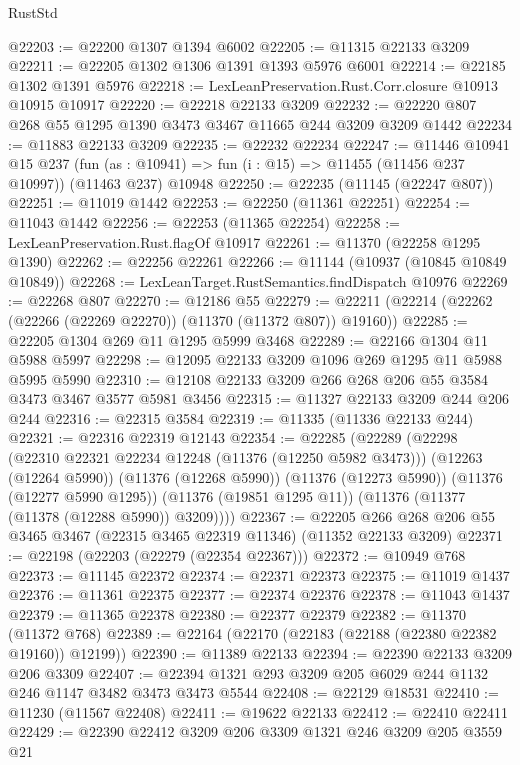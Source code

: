 \begin{lexlean}{RustStd}
\begin{coremodule}
{\begin{coremodule}
{{{{{{{{{{{{{{{{{{{{{{{{{{{{{{{{{{{{{{{{{{{{{{{{{{{{{{{{{{{{{{{{{{{{{{{{{{{{{{{{{{{{{@22203 := @22200 @1307 @1394 @6002
@22205 := @11315 @22133 @3209
@22211 := @22205 @1302 @1306 @1391 @1393 @5976 @6001
@22214 := @22185 @1302 @1391 @5976
@22218 := LexLeanPreservation.Rust.Corr.closure @10913 @10915 @10917
@22220 := @22218 @22133 @3209
@22232 := @22220 @807 @268 @55 @1295 @1390 @3473 @3467 @11665 @244 @3209 @3209 @1442
@22234 := @11883 @22133 @3209
@22235 := @22232 @22234
@22247 := @11446
    @10941
    @15
    @237
    (fun (as : @10941) => fun (i : @15) => @11455 (@11456 @237 @10997))
    (@11463 @237)
    @10948
@22250 := @22235 (@11145 (@22247 @807))
@22251 := @11019 @1442
@22253 := @22250 (@11361 @22251)
@22254 := @11043 @1442
@22256 := @22253 (@11365 @22254)
@22258 := LexLeanPreservation.Rust.flagOf @10917
@22261 := @11370 (@22258 @1295 @1390)
@22262 := @22256 @22261
@22266 := @11144 (@10937 (@10845 @10849 @10849))
@22268 := LexLeanTarget.RustSemantics.findDispatch @10976
@22269 := @22268 @807
@22270 := @12186 @55
@22279 := @22211 (@22214 (@22262 (@22266 (@22269 @22270)) (@11370 (@11372 @807)) @19160))
@22285 := @22205 @1304 @269 @11 @1295 @5999 @3468
@22289 := @22166 @1304 @11 @5988 @5997
@22298 := @12095 @22133 @3209 @1096 @269 @1295 @11 @5988 @5995 @5990
@22310 := @12108 @22133 @3209 @266 @268 @206 @55 @3584 @3473 @3467 @3577 @5981 @3456
@22315 := @11327 @22133 @3209 @244 @206 @244
@22316 := @22315 @3584
@22319 := @11335 (@11336 @22133 @244)
@22321 := @22316 @22319 @12143
@22354 := @22285
    (@22289
      (@22298
        (@22310 @22321 @22234 @12248 (@11376 (@12250 @5982 @3473)))
        (@12263 (@12264 @5990))
        (@11376 (@12268 @5990))
        (@11376 (@12273 @5990))
        (@11376 (@12277 @5990 @1295))
        (@11376 (@19851 @1295 @11))
        (@11376 (@11377 (@11378 (@12288 @5990)) @3209))))
@22367 := @22205 @266 @268 @206 @55 @3465 @3467 (@22315 @3465 @22319 @11346) (@11352 @22133 @3209)
@22371 := @22198 (@22203 (@22279 (@22354 @22367)))
@22372 := @10949 @768
@22373 := @11145 @22372
@22374 := @22371 @22373
@22375 := @11019 @1437
@22376 := @11361 @22375
@22377 := @22374 @22376
@22378 := @11043 @1437
@22379 := @11365 @22378
@22380 := @22377 @22379
@22382 := @11370 (@11372 @768)
@22389 := @22164 (@22170 (@22183 (@22188 (@22380 @22382 @19160)) @12199))
@22390 := @11389 @22133
@22394 := @22390 @22133 @3209 @206 @3309
@22407 := @22394 @1321 @293 @3209 @205 @6029 @244 @1132 @246 @1147 @3482 @3473 @3473 @5544
@22408 := @22129 @18531
@22410 := @11230 (@11567 @22408)
@22411 := @19622 @22133
@22412 := @22410 @22411
@22429 := @22390
    @22412
    @3209
    @206
    @3309
    @1321
    @246
    @3209
    @205
    @3559
    @21
}}}}}}}}}}}}}}}}}}}}}}}}}}}}}}}}}}}}}}}}}}}}}}}}}}}}}}}}}}}}}}}}}}}}}}}}}}}}}}}}}}}}}
\end{coremodule}}
\end{coremodule}
\end{lexlean}
